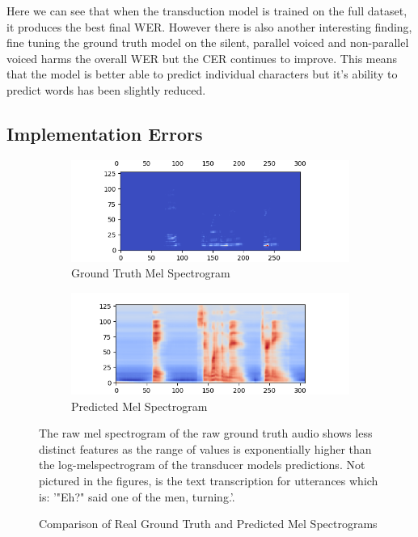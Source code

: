 Here we can see that when the transduction model is trained on the full dataset,
it produces the best final WER. However there is also another interesting finding,
fine tuning the ground truth model on the silent, parallel voiced and non-parallel
voiced harms the overall WER but the CER continues to improve. This means that
the model is better able to predict individual characters but it's ability to
predict words has been slightly reduced.

\subsection{Implementation Errors}

\begin{figure}
  \centering
  \begin{subfigure}{.5\textwidth}
    \centering
    \includegraphics[width=1.\linewidth]{graphics/mel_vs_pred/real/458_g.png}
    \caption{Ground Truth Mel Spectrogram}
    \label{fig:sub1}
  \end{subfigure}%
  \begin{subfigure}{.5\textwidth}
    \centering
    \includegraphics[width=1\linewidth]{graphics/mel_vs_pred/real/458_p.png}
    \caption{Predicted Mel Spectrogram}
    \label{fig:sub2}
  \end{subfigure}
  \caption{Comparison of Real Ground Truth and Predicted Mel Spectrograms}
  \label{fig:real-gt-vs-pred-mel}
  The raw mel spectrogram of the raw ground truth audio shows less distinct features
  as the range of values is exponentially higher than the log-melspectrogram of
  the transducer models predictions. Not pictured in the figures, is
  the text transcription for utterances which is: '"Eh?" said one of the men, turning.'.
\end{figure}

